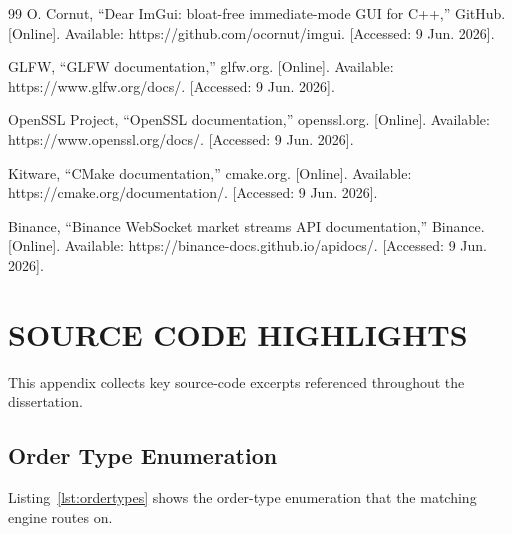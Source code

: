 \documentclass[12pt,oneside,a4paper]{report}
\renewcommand{\cftchappresnum}{CHAPTER }
\begin{document}
\begin{thebibliography}{99}
 O. Cornut, ``Dear ImGui: bloat-free immediate-mode GUI for C++,'' GitHub. [Online]. Available: https://github.com/ocornut/imgui. [Accessed: 9 Jun. 2026].

 GLFW, ``GLFW documentation,'' glfw.org. [Online]. Available: https://www.glfw.org/docs/. [Accessed: 9 Jun. 2026].

 OpenSSL Project, ``OpenSSL documentation,'' openssl.org. [Online]. Available: https://www.openssl.org/docs/. [Accessed: 9 Jun. 2026].

 Kitware, ``CMake documentation,'' cmake.org. [Online]. Available: https://cmake.org/documentation/. [Accessed: 9 Jun. 2026].

 Binance, ``Binance WebSocket market streams API documentation,'' Binance. [Online]. Available: https://binance-docs.github.io/apidocs/. [Accessed: 9 Jun. 2026].

\end{thebibliography}

\clearpage
\appendix
\renewcommand{\chaptername}{Appendix}
\setcounter{chapter}{0}
\renewcommand{\thechapter}{\Alph{chapter}}
\renewcommand{\thetable}{\thechapter.\arabic{table}}
\renewcommand{\thefigure}{\thechapter.\arabic{figure}}
\addtocontents{toc}{\protect\renewcommand{\protect\cftchappresnum}{APPENDIX }}

\chapter{SOURCE CODE HIGHLIGHTS}
\label{app:code}

This appendix collects key source-code excerpts referenced throughout the dissertation.

\section{Order Type Enumeration}

Listing~\ref{lst:ordertypes} shows the order-type enumeration that the matching engine routes on.
\end{document}
